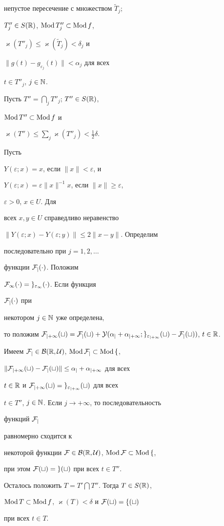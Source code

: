 \begin{pf}
непустое пересечение с множеством $\widetilde T_j$;


$T''_j\in S(\Bbb R)$, $\operatorname{Mod} T''_j\subset\operatorname{Mod} f$,


$\varkappa(T''_j)\le\varkappa(\widetilde T_j)<\delta_j$ и


$\|g(t)-g_{\varepsilon_j}(t)\|<\alpha_j$ для всех


$t\in T''_j$, $j\in\Bbb N$.


Пусть $T''=\bigcap\limits_j T''_j$; $T''\in S(\Bbb R)$,


$\operatorname{Mod} T''\subset \operatorname{Mod} f$ и


$\varkappa(T'')\le\sum\limits_j\varkappa(T''_j)<\frac{1}{2}\delta$.


Пусть


$Y(\varepsilon;x)=x$, если $\|x\|<\varepsilon$, и


$Y(\varepsilon;x)=\varepsilon\|x\|^{-1}x$, если $\|x\|\ge\varepsilon$,


$\varepsilon>0$, $x\in U$. Для


всех $x,y\in U$ справедливо неравенство


$\|Y(\varepsilon;x)-Y(\varepsilon;y)\|\le 2\|x-y\|$. Определим


последовательно при $j=1,2,\dotsc$


функции $\cal F_j(\cdot)$. Положим


$\cal F_1(\cdot)=g_{\varepsilon_1}(\cdot)$. Если функция


$\cal F_j(\cdot)$ при


некотором $j\in\Bbb N$ уже определена,


то положим $\cal F_{j+1}(t)=\cal F_j(t)+Y(\alpha_j+\alpha_{j+1};


g_{\varepsilon_{j+1}}(t)-\cal F_j(t))$, $t\in\Bbb R$.


Имеем $\cal F_j\in B(\Bbb R,U)$, $\operatorname{Mod}\cal F_j\subset\operatorname{Mod} f$,


$\|\cal F_{j+1}(t)-\cal F_j(t)\|\le\alpha_j+\alpha_{j+1}$ для всех


$t\in\Bbb R$ и $\cal F_{j+1}(t)=g_{\varepsilon_{j+1}}(t)$ для всех


$t\in T''$, $j\in\Bbb N$. Если $j\to+\infty$, то последовательность


функций $\cal F_j$


равномерно сходится к


некоторой функции $\cal F\in B(\Bbb R,U)$, $\operatorname{Mod}\cal F\subset\operatorname{Mod} f$,


при этом $\cal F(t)=g(t)$ при всех $t\in T''$.


Осталось положить $T=T'\bigcap T''$. Тогда $T\in S(\Bbb R)$,


$\operatorname{Mod} T\subset\operatorname{Mod} f$, $\varkappa(T)<\delta$ и $\cal F(t)=f(t)$


при всех $t\in T$.


\end{pf}


